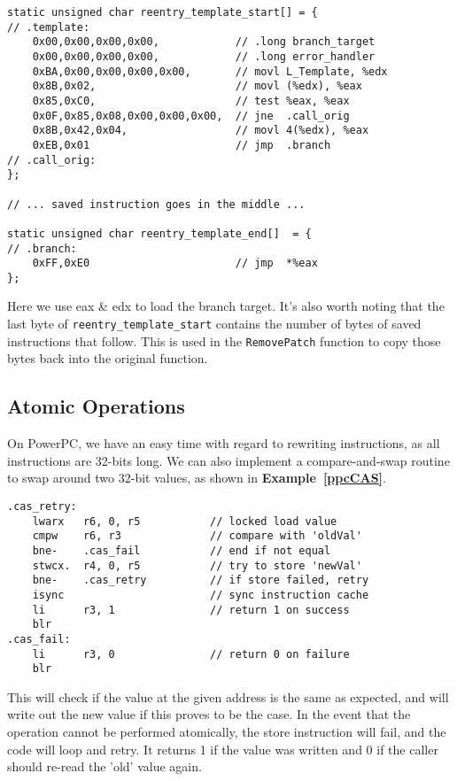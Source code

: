 \documentclass[english]{article}
\begin{document}
\begin{lstlisting}[label=intelReentryIsland, caption=The two components of the IA-32 reentry island template.]
static unsigned char reentry_template_start[] = {
// .template:
    0x00,0x00,0x00,0x00,            // .long branch_target
    0x00,0x00,0x00,0x00,            // .long error_handler
    0xBA,0x00,0x00,0x00,0x00,       // movl L_Template, %edx
    0x8B,0x02,                      // movl (%edx), %eax
    0x85,0xC0,                      // test %eax, %eax
    0x0F,0x85,0x08,0x00,0x00,0x00,  // jne  .call_orig
    0x8B,0x42,0x04,                 // movl 4(%edx), %eax
    0xEB,0x01                       // jmp  .branch
// .call_orig:
};

// ... saved instruction goes in the middle ...

static unsigned char reentry_template_end[]  = {
// .branch:
    0xFF,0xE0                       // jmp  *%eax
};
\end{lstlisting}

Here we use eax \& edx to load the branch target. It's also worth noting that the last byte of \texttt{reentry\_template\_start} contains the number of bytes of saved instructions that follow. This is used in the \texttt{RemovePatch} function to copy those bytes back into the original function.

\subsection{Atomic Operations}
On PowerPC, we have an easy time with regard to rewriting instructions, as all instructions are 32-bits long. We can also implement a compare-and-swap routine to swap around two 32-bit values, as shown in \textbf{Example~\ref{ppcCAS}}.

\begin{lstlisting}[label= ppcCAS, caption=PowerPC \texttt{CompareAndSwap()} routine.]
.cas_retry:
    lwarx   r6, 0, r5           // locked load value
    cmpw    r6, r3              // compare with 'oldVal'
    bne-    .cas_fail           // end if not equal
    stwcx.  r4, 0, r5           // try to store 'newVal'
    bne-    .cas_retry          // if store failed, retry
    isync                       // sync instruction cache
    li      r3, 1               // return 1 on success
    blr
.cas_fail:
    li      r3, 0               // return 0 on failure
    blr
\end{lstlisting}

This will check if the value at the given address is the same as expected, and will write out the new value if this proves to be the case. In the event that the operation cannot be performed atomically, the store instruction will fail, and the code will loop and retry. It returns 1 if the value was written and 0 if the caller should re-read the 'old' value again.
\end{document}
